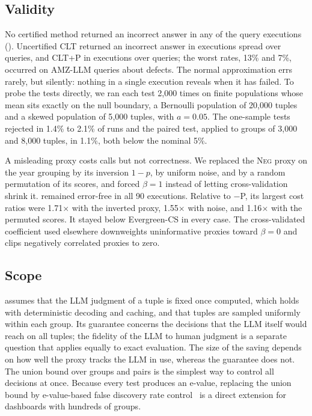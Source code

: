 \subsection{Validity}
\label{sec:validity}



No certified method returned an incorrect answer in any of the \numNEXEC{} query executions ().
Uncertified CLT returned an incorrect answer in \numNCLTERR{} executions spread over \numNCLTERRQ{} queries, and CLT+P in \numNCLTPERR{} executions over \numNCLTPERRQ{} queries; the worst rates, 13\% and 7\%, occurred on AMZ-LLM queries about defects.
The normal approximation errs rarely, but silently: nothing in a single execution reveals when it has failed.
To probe the tests directly, we ran each test 2{,}000 times on finite populations whose mean sits exactly on the null boundary, a Bernoulli population of 20{,}000 tuples and a skewed population of 5{,}000 tuples, with $a=0.05$.
The one-sample tests rejected in 1.4\% to 2.1\% of runs and the paired test, applied to groups of 3{,}000 and 8{,}000 tuples, in 1.1\%, both below the nominal 5\%.

A misleading proxy costs calls but not correctness.
We replaced the \textsc{Neg} proxy on the year grouping by its inversion $1-p$, by uniform noise, and by a random permutation of its scores, and forced $\beta=1$ instead of letting cross-validation shrink it.
\sys{} remained error-free in all 90 executions.
Relative to \sys{}$-$P, its largest cost ratios were 1.71$\times$ with the inverted proxy, 1.55$\times$ with noise, and 1.16$\times$ with the permuted scores. It stayed below Evergreen-CS in every case.
The cross-validated coefficient used elsewhere downweights uninformative proxies toward $\beta=0$ and clips negatively correlated proxies to zero.

\subsection{Scope}
\label{sec:scope}

\sys{} assumes that the LLM judgment of a tuple is fixed once computed, which holds with deterministic decoding and caching, and that tuples are sampled uniformly within each group.
Its guarantee concerns the decisions that the LLM itself would reach on all tuples; the fidelity of the LLM to human judgment is a separate question that applies equally to exact evaluation.
The size of the saving depends on how well the proxy tracks the LLM in use, whereas the guarantee does not.
The union bound over groups and pairs is the simplest way to control all decisions at once.
Because every test produces an e-value, replacing the union bound by e-value-based false discovery rate control~\cite{wang2022ebh} is a direct extension for dashboards with hundreds of groups.
